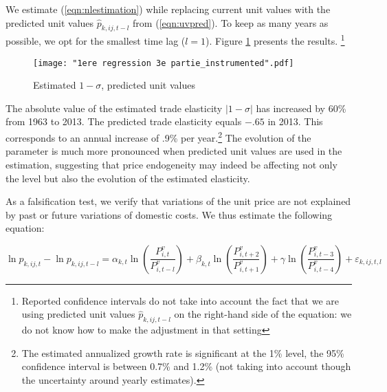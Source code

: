 \documentclass[12pt,twoside,a4paper,notitlepage]{article}
\begin{document}
We estimate (\ref{eqn:nlestimation}) while replacing current unit values with the predicted unit values $\hat{p}_{k,ij,t-l}$ from (\ref{eqn:uvpred}). To keep as many years as possible, we opt for the smallest time lag ($l=1$). Figure \ref{fig:instr} presents the results.
\footnote{Reported confidence intervals do not take into account the fact that we are using predicted unit values $\hat{p}_{k,ij,t-l}$  on the right-hand side of the equation: we do not know how to make the adjustment in that setting}

\begin{figure}[H]
\caption{Estimated $1-\sigma$, predicted unit values}
\texttt{[image: "1ere regression 3e partie\_instrumented".pdf]}
\label{fig:instr}
\end{figure}

The absolute value of the estimated trade elasticity $|1-\sigma|$ has increased by 60\% from 1963 to 2013. The predicted trade elasticity equals $-.65$ in 2013. 
This corresponds to an annual increase of .9\% per year.\footnote{The estimated annualized growth rate is significant at the 1\% level, the 95\% confidence interval is between 0.7\% and 1.2\% (not taking into account though the uncertainty around yearly estimates).} The evolution of the parameter is much more pronounced when predicted unit values are used in the estimation, suggesting that price endogeneity may indeed be affecting not only the level but also the evolution of the estimated elasticity.

As a falsification test, we verify that variations of the unit price are not explained by past or future variations of domestic costs.
We thus estimate the following equation:

\[\ln {{p}_{k,ij,t}}-\ln {{p}_{k,ij,t-l}}={{\alpha }_{k,t}}\ln \left( \frac{P_{i,t}^{v}}{P_{i,t-l}^{v}} \right)+{{\beta }_{k,t}}\ln \left( \frac{P_{i,t+2}^{v}}{P_{i,t+1}^{v}} \right)+\gamma \ln \left( \frac{P_{i,t-3}^{v}}{P_{i,t-4}^{v}} \right)+{{\varepsilon }_{k,ij,t,l}}\] 
\fi
\end{document}
